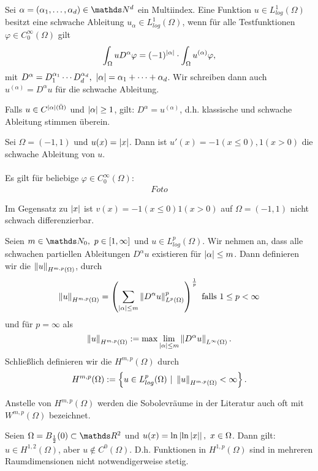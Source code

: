 Sei $\alpha = (\alpha_1\dt{,}\alpha_d)\in \N^d$ ein Multiindex.
Eine Funktion $u\in L_{log}^1(\Omega)$ besitzt eine schwache Ableitung $u_\alpha \in L_{log}^1(\Omega)$, wenn für alle Testfunktionen $\varphi\in C_0^\infty(\Omega)$ gilt
\[
\int_{\Omega} u D^\alpha \varphi = (-1)^{\left\vert\alpha\right\vert} \cdot \int_{\Omega} u^{(\alpha)} \varphi,
\]
mit $D^\alpha = D_1^{\alpha_1}\cdots D_d^{\alpha_d},~\left\vert\alpha\right\vert = \alpha_1 + \dots + \alpha_d$.
Wir schreiben dann auch $u^{(\alpha)} = D^\alpha u$ für die schwache Ableitung.

Falls $u\in C^{\left\vert\alpha\right\vert(\bar{\Omega})}$ und $\left\vert\alpha\right\vert\ge 1$, gilt: $D^\alpha= u^{(\alpha)}$, d.h. klassische und schwache Ableitung stimmen überein.

Sei $\Omega =(-1,1)$ und $u(x) =\left\vert x\right\vert$.
Dann ist $u'(x) = -1 (x\le 0), 1 (x> 0)$ die schwache Ableitung von $u$.\\

\\
Es gilt für beliebige $\varphi\in C_0^\infty(\Omega)$:
\begin{align*}
Foto
\end{align*}

Im Gegensatz zu $\left\vert x\right\vert$ ist $v(x)= -1 (x\le 0) 1 (x>0)$ auf $\Omega = (-1,1)$ nicht schwach differenzierbar.

Seien $m\in \N_0,~p\in [1,\infty]$ und $u\in L_{log}^p(\Omega)$.
Wir nehmen an, dass alle schwachen partiellen Ableitungen $D^\alpha u$ existieren für $\left\vert\alpha\right\vert \le m$.
Dann definieren wir die  $\left\Vert u\right\Vert_{H^{m,p}(\Omega)}$, durch
\[
\left\Vert u\right\Vert_{H^{m,p}(\Omega)} = \left( \sum_{\left\vert\alpha\right\vert\le m} \left\Vert D^\alpha u\right\Vert_{L^p(\Omega)}^p\right)^{\frac{1}{p}}\text{ falls } 1\le p< \infty
\]
und für $p=\infty$ als 
\[
\left\Vert u\right\Vert_{H^{m,p}(\Omega)} := \max\lim\limits_{\left\vert\alpha\right\vert\le m} \left\Vert D^\alpha u\right\Vert_{L^\infty (\Omega)}.
\]
Schließlich definieren wir die  $H^{m,p}(\Omega)$ durch
\[
H^{m,p}(\Omega) := \left\{u\in L_{log}^p(\Omega) ~|~ \left\Vert u\right\Vert_{H^{m,p}(\Omega)}< \infty\right\}.
\]

Anstelle von $H^{m,p}(\Omega)$ werden die Sobolevräume in der Literatur auch oft mit $W^{m,p}(\Omega)$ bezeichnet.

Seien $\Omega = B_{\frac{1}{2}}(0)\subset \R^2$ und $u(x) = \ln \left\vert\ln \left\vert x\right\vert\right\vert,~x\in \Omega$.
Dann gilt: $u\in H^{1,2}(\Omega)$, aber $u\notin C^0(\Omega)$.
D.h. Funktionen in $H^{1,p}(\Omega)$ sind in mehreren Raumdimensionen nicht notwendigerweise stetig.

